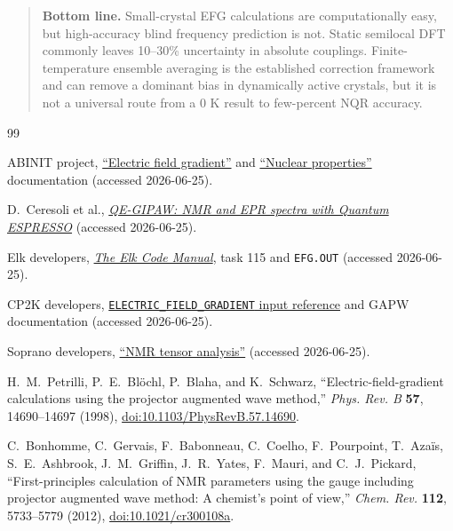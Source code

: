 \documentclass[10pt]{article}
\begin{document}
\begin{quote}
\textbf{Bottom line.}  Small-crystal EFG calculations are computationally easy, but high-accuracy blind frequency prediction is not.  Static semilocal DFT commonly leaves 10--30\% uncertainty in absolute couplings.  Finite-temperature ensemble averaging is the established correction framework and can remove a dominant bias in dynamically active crystals, but it is not a universal route from a 0 K result to few-percent NQR accuracy.
\end{quote}

\begin{thebibliography}{99}
\footnotesize
\setlength{\itemsep}{0pt}
\setlength{\parsep}{0pt}
\setlength{\parskip}{0pt}

ABINIT project, \href{https://docs.abinit.org/topics/EFG/}{``Electric field gradient''} and
\href{https://docs.abinit.org/tutorial/nuc/}{``Nuclear properties''} documentation (accessed 2026-06-25).

D.~Ceresoli et al., \href{https://github.com/dceresoli/qe-gipaw}{\emph{QE-GIPAW: NMR and EPR spectra with Quantum ESPRESSO}} (accessed 2026-06-25).

Elk developers, \href{https://elk.sourceforge.io/elk.pdf}{\emph{The Elk Code Manual}}, task 115 and \texttt{EFG.OUT} (accessed 2026-06-25).

CP2K developers, \href{https://manual.cp2k.org/trunk/CP2K_INPUT/FORCE_EVAL/DFT/PRINT/ELECTRIC_FIELD_GRADIENT.html}{\texttt{ELECTRIC\_FIELD\_GRADIENT} input reference} and GAPW documentation (accessed 2026-06-25).

Soprano developers, \href{https://ccp-nc.github.io/soprano/_autosummary/soprano.nmr.tensor.html}{``NMR tensor analysis''} (accessed 2026-06-25).

H.~M.~Petrilli, P.~E.~Blöchl, P.~Blaha, and K.~Schwarz,
``Electric-field-gradient calculations using the projector augmented wave method,''
\emph{Phys. Rev. B} \textbf{57}, 14690--14697 (1998),
\href{https://doi.org/10.1103/PhysRevB.57.14690}{doi:10.1103/PhysRevB.57.14690}.

C.~Bonhomme, C.~Gervais, F.~Babonneau, C.~Coelho, F.~Pourpoint, T.~Azaïs,
S.~E.~Ashbrook, J.~M.~Griffin, J.~R.~Yates, F.~Mauri, and C.~J.~Pickard,
``First-principles calculation of NMR parameters using the gauge including projector augmented wave method: A chemist's point of view,''
\emph{Chem. Rev.} \textbf{112}, 5733--5779 (2012),
\href{https://doi.org/10.1021/cr300108a}{doi:10.1021/cr300108a}.


\end{thebibliography}
\end{document}
